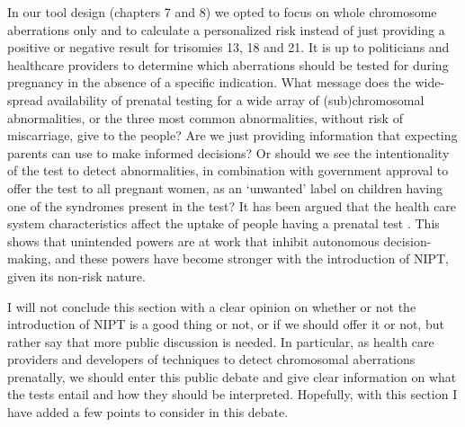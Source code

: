 In our tool design (chapters 7 and 8) we opted to focus on whole chromosome aberrations only and to calculate a personalized risk instead of just providing a positive or negative result for trisomies 13, 18 and 21. 
It is up to politicians and healthcare providers to determine which aberrations should be tested for during pregnancy in the absence of a specific indication. 
What message does the wide-spread availability of prenatal testing for a wide array of (sub)chromosomal abnormalities, or the three most common abnormalities, without risk of miscarriage, give to the people? 
Are we just providing information that expecting parents can use to make informed decisions? 
Or should we see the intentionality of the test to detect abnormalities, in combination with government approval to offer the test to all pregnant women, as an ‘unwanted’ label on children having one of the syndromes present in the test? 
It has been argued that the health care system characteristics affect the uptake of people having a prenatal test \cite{Crombag_2016}. 
This shows that unintended powers are at work that inhibit autonomous decision-making, and these powers have become stronger with the introduction of NIPT, given its non-risk nature. 

I will not conclude this section with a clear opinion on whether or not the introduction of NIPT is a good thing or not, or if we should offer it or not, but rather say that more public discussion is needed. 
In particular, as health care providers and developers of techniques to detect chromosomal aberrations prenatally, we should enter this public debate and give clear information on what the tests entail and how they should be interpreted. 
Hopefully, with this section I have added a few points to consider in this debate. 

